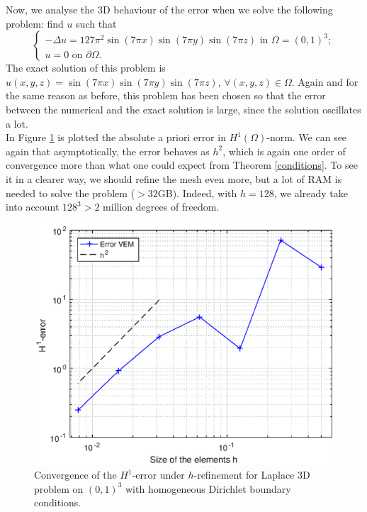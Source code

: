 Now, we analyse the $3$D behaviour of the error when we solve the following problem: find $u$ such that
\begin{equation*}
\begin{cases}
-\Delta u = 127\pi^2\sin(7\pi x)\sin(7\pi y)\sin(7\pi z) \text{ in } \Omega = (0,1)^3;\\
u = 0 \text{ on } \partial \Omega.
\end{cases}
\end{equation*}
The exact solution of this problem is $u(x,y,z)=\sin(7\pi x)\sin(7\pi y)\sin(7\pi z)$, $\forall (x,y,z)\in \Omega$. Again and for the same reason as before, this problem has been chosen so that the error between the numerical and the exact solution is large, since the solution oscillates a lot. \\

In Figure \ref{img:conv3d} is plotted the absolute a priori error in $H^1(\Omega)$-norm. We can see again that asymptotically, the error behaves as $h^2$, which is again one order of convergence more than what one could expect from Theorem \ref{conditions}. To see it in a clearer way, we should refine the mesh even more, but a lot of RAM is needed to solve the problem ($>32$GB). Indeed, with $h=128$, we already take into account $128^3>2$ million degrees of freedom. 

\begin{figure}[!h]
\centering
\includegraphics[scale=0.8]{images/convergencePlot3D.eps}
\caption{Convergence of the $H^1$-error under $h$-refinement for Laplace 3D problem on $(0,1)^3$ with homogeneous Dirichlet boundary conditions.}
\label{img:conv3d}
\end{figure}

